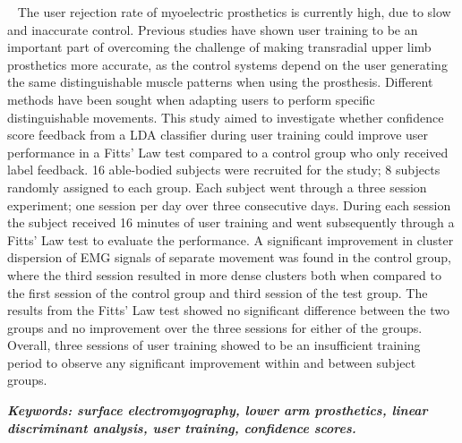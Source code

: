 \textemdash ~ The user rejection rate of myoelectric prosthetics is currently high, due to slow and inaccurate control. Previous studies have shown user training to be an important part of overcoming the challenge of making transradial upper limb prosthetics more accurate, as the control systems depend on the user generating the same distinguishable muscle patterns when using the prosthesis. Different methods have been sought when adapting users to perform specific distinguishable movements. This study aimed to investigate whether confidence score feedback from a LDA classifier during user training could improve user performance in a Fitts' Law test compared to a control group who only received label feedback. %
16 able-bodied subjects were recruited for the study; 8 subjects randomly assigned to each group. Each subject went through a three session experiment; one session per day over three consecutive days. During each session the subject received 16 minutes of user training and went subsequently through a Fitts' Law test to evaluate the performance.
A significant improvement in cluster dispersion of EMG signals of separate movement was found in the control group, where the third session resulted in more dense clusters both when compared to the first session of the control group and third session of the test group. The results from the Fitts' Law test showed no significant difference between the two groups and no improvement over the three sessions for either of the groups. Overall, three sessions of user training showed to be an insufficient training period to observe any significant improvement within and between subject groups.

\textit{\textbf{Keywords: surface electromyography, lower arm prosthetics, linear discriminant analysis, user training, confidence scores.}}